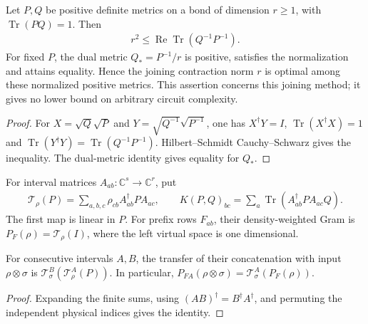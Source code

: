 \begin{lemma}
    \label{thm:mpu_balanced_gram_contraction_optimality}
    \leanok
    Let $P,Q$ be positive definite metrics on a bond of dimension
    $r\geq1$, with $\operatorname{Tr}(PQ)=1$. Then
    \begin{align}
        r^2\leq\operatorname{Re}\operatorname{Tr}(Q^{-1}P^{-1}).
    \end{align}
    For fixed $P$, the dual metric $Q_*=P^{-1}/r$ is positive,
    satisfies the normalization and attains equality. Hence the
    joining contraction norm $r$ is optimal among these normalized
    positive metrics. This assertion concerns this joining method;
    it gives no lower bound on arbitrary circuit complexity.
\end{lemma}
\begin{proof}\leanok
    For $X=\sqrt Q\sqrt P$ and $Y=\sqrt{Q^{-1}}\sqrt{P^{-1}}$, one has
    $X^\dagger Y=I$,
    $\operatorname{Tr}(X^\dagger X)=1$ and
    $\operatorname{Tr}(Y^\dagger Y)=\operatorname{Tr}(Q^{-1}P^{-1})$.
    Hilbert--Schmidt Cauchy--Schwarz gives the inequality.
    The dual-metric identity gives equality for $Q_*$.
\end{proof}

\begin{definition}
    \label{def:mpu_density_interval_grams}
    \leanok
    For interval matrices $A_{ab}:\mathbb C^s\to\mathbb C^r$, put
    \begin{align}
        \mathcal T_\rho(P)=\sum_{a,b,c}\rho_{cb}A_{ab}^\dagger PA_{ac},
        \qquad
        K(P,Q)_{bc}=\sum_a\operatorname{Tr}(A_{ab}^\dagger PA_{ac}Q).
    \end{align}
    The first map is linear in $P$. For prefix rows $F_{ab}$, their
    density-weighted Gram is $P_F(\rho)=\mathcal T_\rho(I)$, where
    the left virtual space is one dimensional.
\end{definition}

\begin{lemma}
    \label{thm:mpu_density_transfer_concatenation}
    \leanok
    For consecutive intervals $A,B$, the transfer of their concatenation
    with input $\rho\otimes\sigma$ is
    $\mathcal T^B_\sigma(\mathcal T^A_\rho(P))$.
    In particular,
    $P_{FA}(\rho\otimes\sigma)=\mathcal T^A_\sigma(P_F(\rho))$.
\end{lemma}
\begin{proof}\leanok
    Expanding the finite sums, using $(AB)^\dagger=B^\dagger A^\dagger$,
    and permuting the independent physical indices gives the identity.
\end{proof}

